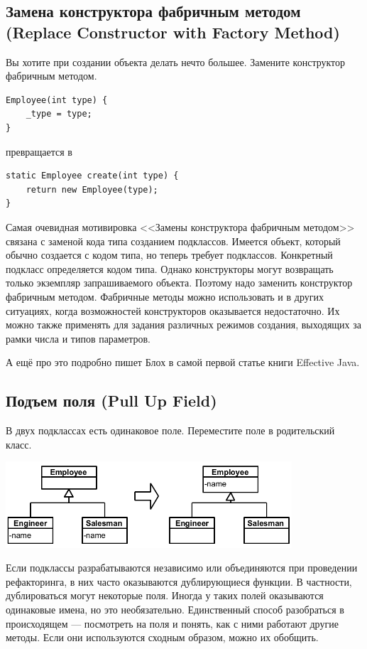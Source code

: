 \documentclass{../../text-style}
\begin{document}
\subsection{Замена конструктора фабричным методом (Replace Constructor with Factory Method)}

Вы хотите при создании объекта делать нечто большее. Замените конструктор фабричным методом.

\begin{verbatim}
Employee(int type) {
    _type = type;
}
\end{verbatim}

превращается в

\begin{verbatim}
static Employee create(int type) {
    return new Employee(type);
}
\end{verbatim}

Самая очевидная мотивировка <<Замены конструктора фабричным методом>> связана с заменой кода типа созданием подклассов. Имеется объект, который обычно создается с кодом типа, но теперь требует подклассов. Конкретный подкласс определяется кодом типа. Однако конструкторы могут возвращать только экземпляр запрашиваемого объекта. Поэтому надо заменить конструктор фабричным методом. Фабричные методы можно использовать и в других ситуациях, когда возможностей конструкторов оказывается недостаточно. Их можно также применять для задания различных режимов создания, выходящих за рамки числа и типов параметров.

А ещё про это подробно пишет Блох в самой первой статье книги Effective Java.

\subsection{Подъем поля (Pull Up Field)}

В двух подклассах есть одинаковое поле. Переместите поле в родительский класс.

\begin{center}
    \includegraphics[width=0.8\textwidth]{pullUpField.png}
\end{center}

Если подклассы разрабатываются независимо или объединяются при проведении рефакторинга, в них часто оказываются дублирующиеся функции. В частности, дублироваться могут некоторые поля. Иногда у таких полей оказываются одинаковые имена, но это необязательно. Единственный способ разобраться в происходящем --- посмотреть на поля и понять, как с ними работают другие методы. Если они используются сходным образом, можно их обобщить.
\end{document}

